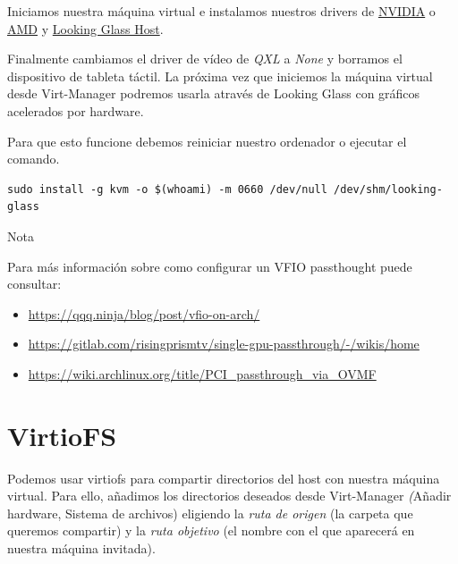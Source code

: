 \documentclass[12pt]{article}
\begin{document}
Iniciamos nuestra máquina virtual e instalamos nuestros drivers de \href{https://www.nvidia.es/Download/index.aspx?lang=es}{NVIDIA} o \href{https://www.amd.com/es/support}{AMD} y \href{https://looking-glass.io/downloads}{Looking Glass Host}.

\vspace{5pt}

Finalmente cambiamos el driver de vídeo de \emph{QXL} a \emph{None} y borramos el dispositivo de tableta táctil. La próxima vez que iniciemos la máquina virtual desde Virt-Manager podremos usarla através de Looking Glass con gráficos acelerados por hardware.

\noindent Para que esto funcione debemos reiniciar nuestro ordenador o ejecutar el comando.

\begin{verbatim}
sudo install -g kvm -o $(whoami) -m 0660 /dev/null /dev/shm/looking-glass
\end{verbatim}

\begin{mybox}{Nota}

	Para más información sobre como configurar un VFIO passthought puede consultar:

	\vspace{-7.5pt}

	\begin{itemize}
		\setlength\itemsep{-0.3em}
		\item \href{https://qqq.ninja/blog/post/vfio-on-arch/}
		      {https://qqq.ninja/blog/post/vfio-on-arch/}
		\item \href{https://gitlab.com/risingprismtv/single-gpu-passthrough/-/wikis/home}
		      {https://gitlab.com/risingprismtv/single-gpu-passthrough/-/wikis/home}
		\item \href{https://wiki.archlinux.org/title/PCI\_passthrough\_via\_OVMF}
		      {https://wiki.archlinux.org/title/PCI\_passthrough\_via\_OVMF}
	\end{itemize}
\end{mybox}

\section{VirtioFS}

Podemos usar virtiofs para compartir directorios del host con nuestra máquina virtual. Para ello, añadimos los directorios deseados desde Virt-Manager \emph(Añadir hardware, Sistema de archivos) eligiendo la \emph{ruta de origen} (la carpeta que queremos compartir) y la \emph{ruta objetivo} (el nombre con el que aparecerá en nuestra máquina invitada).
\end{document}
